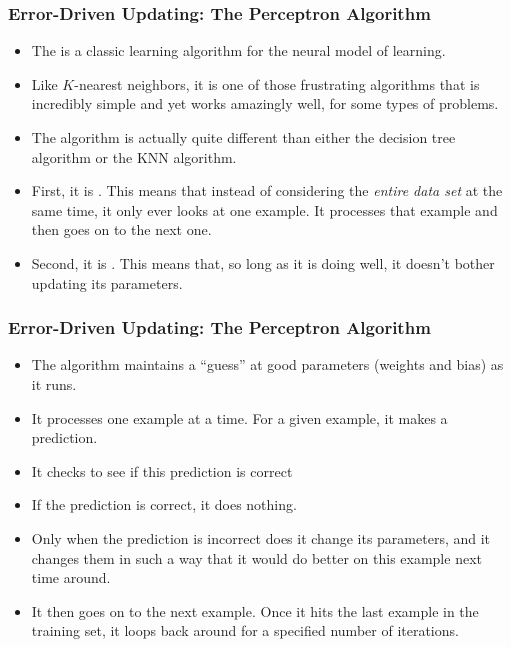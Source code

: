 \documentclass[trans]{beamer}
\begin{document}
\begin{frame}
  \frametitle{Error-Driven Updating: The Perceptron Algorithm}
\begin{itemize}
\item
The  is a classic learning algorithm for the
neural model of learning. 
\item Like $K$-nearest neighbors, it is one of
those frustrating algorithms that is incredibly simple and yet works
amazingly well, for some types of problems.
\item 
The algorithm is actually quite different than either the decision
tree algorithm or the KNN algorithm.  
\item First, it is .
This means that instead of considering the \emph{entire data set} at
the same time, it only ever looks at one example.  It processes that
example and then goes on to the next one.  
\item Second, it is
.  This means that, so long as it is doing well,
it doesn't bother updating its parameters.
\end{itemize}
\end{frame}

\begin{frame}
  \frametitle{Error-Driven Updating: The Perceptron Algorithm}
\begin{itemize}
\item
The algorithm maintains a ``guess'' at good parameters (weights and
bias) as it runs.
\item   It processes one example at a time.  For a given
example, it makes a prediction. 
\item It checks to see if this prediction
is correct 
\item  If the prediction is correct, it does
nothing. 
\item Only when the prediction is incorrect does it change its
parameters, and it changes them in such a way that it would do better
on this example next time around.  
\item It then goes on to the next
example.  Once it hits the last example in the training set, it loops
back around for a specified number of iterations.
\end{itemize}
\end{frame}
\end{document}
